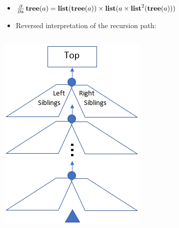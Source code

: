 \begin{frame}
\begin{itemize}
\item $\Pa \Ftree(a) = \Flist(\Ftree(a)) \times \Flist(a \times \Flist^2(\Ftree(a)))$
\item Reversed interpretation of the recursion path:
\end{itemize}

\bigskip

\begin{columns}
\begin{column}{0.4\textwidth}
\centering
\includegraphics[width=\textwidth]{figure/zipper}
\end{column}


\end{columns}
\end{frame}
